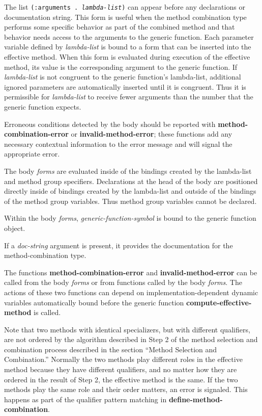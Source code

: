 \vfill\eject
The list {\tt (:arguments . {\it lambda-list\/})} can appear before
any declarations or documentation string.  This form is useful when
the method combination type performs some specific behavior as part of
the combined method and that behavior needs access to the arguments to
the generic function.  Each parameter variable defined by {\it
lambda-list\/} is bound to a form that can be inserted into the
effective method.  When this form is evaluated during execution of the
effective method, its value is the corresponding argument to the
generic function.  If {\it lambda-list\/} is not congruent to the
generic function's lambda-list, additional ignored parameters are
automatically inserted until it is congruent.  Thus it is permissible
for {\it lambda-list\/} to receive fewer arguments than the number
that the generic function expects.
 
Erroneous conditions detected by the body should be reported with
{\bf method-combination-error} or {\bf invalid-method-error}; these functions
add any necessary contextual information to the error message and will
signal the appropriate error.

The body {\it forms\/} are evaluated inside of the bindings created by the
lambda-list and method group specifiers.  Declarations at the head of
the body are positioned directly inside of bindings created by the
lambda-list and outside of the bindings of the method group variables. 
Thus method group variables cannot be declared.

Within the body {\it forms\/}, {\it generic-function-symbol}
is bound to the generic function object.

If a {\it doc-string\/} argument is present, it provides the
documentation for the method-combination type.

The functions {\bf method-combination-error} and {\bf
invalid-method-error} can be called from the body {\it forms\/} or
from functions called by the body {\it forms\/}.  The actions of these
two functions can depend on implementation-dependent dynamic variables
automatically bound before the generic function {\bf
compute-effective-method} is called.

Note that two methods with identical specializers, but with different
qualifiers, are not ordered by the algorithm described in Step 2 of
the method selection and combination process described in the section
``Method Selection and Combination.''  Normally the two methods play
different roles in the effective method because they have different
qualifiers, and no matter how they are ordered in the result of Step
2, the effective method is the same.  If the two methods play the same
role and their order matters, an error is signaled.  This happens as
part of the qualifier pattern matching in {\bf
define-method-combination}.

